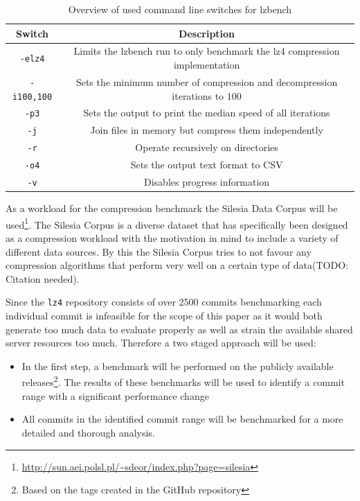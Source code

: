 \documentclass[	runningheads,
				a4paper]{llncs}
\begin{document}
	\begin{table}
		\caption{Overview of used command line switches for lzbench}
		\label{tab:cmd_switches}
		\centering
		\begin{tabular}{|c|c|}
			\hline
			\textbf{Switch} & \textbf{Description}\\
			\hline\hline
			\texttt{-elz4} & Limits the lzbench run to only benchmark the lz4 compression implementation \\
			\hline
			\texttt{-i100,100} & Sets the minimum number of compression and decompression iterations to $100$ \\
			\hline
			\texttt{-p3} & Sets the output to print the median speed of all iterations \\
			\hline
			\texttt{-j} & Join files in memory but compress them independently \\
			\hline
			\texttt{-r} & Operate recursively on directories \\
			\hline 
			\texttt{-o4} & Sets the output text format to CSV \\
			\hline
			\texttt{-v} & Disables progress information \\
			\hline
		\end{tabular}
	\end{table}
	
	As a workload for the compression benchmark the Silesia Data Corpus will be used\footnote{\url{http://sun.aei.polsl.pl/~sdeor/index.php?page=silesia}}. The Silesia Corpus is a diverse dataset that has specifically been designed as a compression workload with the motivation in mind to include a variety of different data sources. By this the Silesia Corpus tries to not favour any compression algorithms that perform very well on a certain type of data(TODO: Citation needed).

	Since the \texttt{lz4} repository consists of over 2500 commits benchmarking each individual commit is infeasible for the scope of this paper as it would both generate too much data to evaluate properly as well as strain the available shared server resources too much. Therefore a two staged approach will be used:
\begin{itemize}
	\item In the first step, a benchmark will be performed on the publicly available releases\footnote{Based on the tags created in the GitHub repository}. The results of these benchmarks will be used to identify a commit range with a significant performance change
	\item All commits in the identified commit range will be benchmarked for a more detailed and thorough analysis.
\end{itemize}
\end{document}
